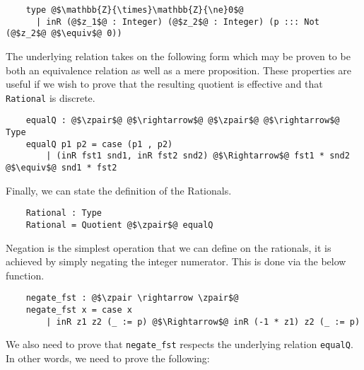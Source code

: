 \documentclass[12pt,twoside,maitrise]{dms}
\theoremstyle{definition}
\numberwithin{equation}{section}
\numberwithin{table}{chapter}
\numberwithin{figure}{chapter}
\newcommand\id[1] {\texttt{#1}}
\begin{document}
\begin{verbatim}
    type @$\mathbb{Z}{\times}\mathbb{Z}{\ne}0$@
      | inR (@$z_1$@ : Integer) (@$z_2$@ : Integer) (p ::: Not (@$z_2$@ @$\equiv$@ 0))
\end{verbatim}

The underlying relation takes on the following form which may be proven to be
both an equivalence relation as well as a mere proposition. These properties are
useful if we wish to prove that the resulting quotient is effective and that
\id{Rational} is discrete.

\begin{verbatim}
    equalQ : @$\zpair$@ @$\rightarrow$@ @$\zpair$@ @$\rightarrow$@ Type
    equalQ p1 p2 = case (p1 , p2)
        | (inR fst1 snd1, inR fst2 snd2) @$\Rightarrow$@ fst1 * snd2 @$\equiv$@ snd1 * fst2
\end{verbatim}

Finally, we can state the definition of the Rationals.

\begin{verbatim}
    Rational : Type
    Rational = Quotient @$\zpair$@ equalQ
\end{verbatim}

Negation is the simplest operation that we can define on the rationals, it is
achieved by simply negating the integer numerator. This is done via the below
function.

\begin{verbatim}
    negate_fst : @$\zpair \rightarrow \zpair$@
    negate_fst x = case x
        | inR z1 z2 (_ := p) @$\Rightarrow$@ inR (-1 * z1) z2 (_ := p)
\end{verbatim}

We also need to prove that \id{negate\_fst} respects the underlying relation
\id{equalQ}. In other words, we need to prove the following:
\end{document}
